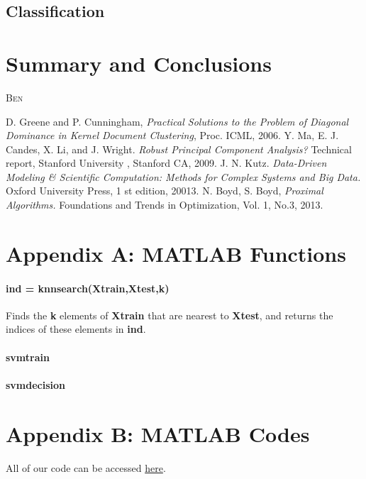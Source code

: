 \documentclass[12pt]{article}
\newcommand{\comment}[1]{\textsc{\color[rgb]{1,0,0}#1}}
\begin{document}
\subsection{Classification}

\section{Summary and Conclusions}
\comment{Ben}

\begin{thebibliography}{4}
 D. Greene and P. Cunningham, \emph{Practical Solutions to the Problem of Diagonal Dominance in Kernel Document Clustering}, Proc. ICML, 2006.
 Y. Ma, E. J. Candes, X. Li, and J. Wright. \emph{Robust Principal Component Analysis?} Technical report, Stanford University , Stanford CA, 2009.
 J. N. Kutz. \emph{Data-Driven Modeling \& Scientific Computation: Methods for Complex Systems and Big Data.} Oxford University Press, 1 st edition, 20013.
 N. Boyd, S. Boyd, \emph{Proximal Algorithms.} Foundations and Trends in Optimization, Vol. 1, No.3, 2013.
\end{thebibliography}

\newpage
\section*{Appendix A: MATLAB Functions}

\paragraph{ind = knnsearch(Xtrain,Xtest,k)} Finds the \textbf{k} elements of \textbf{Xtrain} that are nearest to \textbf{Xtest}, and returns the indices of these elements in \textbf{ind}.

\paragraph{svmtrain}

\paragraph{svmdecision}

\section*{Appendix B: MATLAB Codes}

All of our code can be accessed {\color{blue}\href{https://github.com/kels271828/582FinalProject.git}{here}}.

\end{document}
